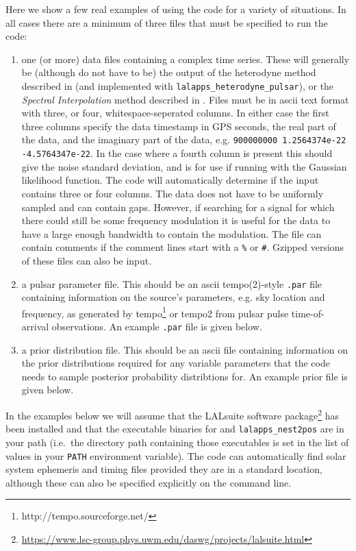 Here we show a few real examples of using the code for a variety of situations. In all cases there are a minimum of
three files that must be specified to run the code:
\begin{enumerate}
 \item one (or more) data files containing a complex time series. These will generally be (although do not have to be) the output
 of the heterodyne method described in \citep{2005PhRvD..72j2002D} (and implemented with {\tt lalapps\_heterodyne\_pulsar}), or
 the {\it Spectral Interpolation} method described in \citep{2017CQGra..34a5010D}. Files must be in ascii text format with three, or
 four, whitespace-seperated columns. In either case the first three columns
 specify the data timestamp in GPS seconds, the real part of the data, and the imaginary part of the data, e.g.
 \verb|900000000 1.2564374e-22 -4.5764347e-22|. In the case where a fourth column is present this should give the noise standard
 deviation, and is for use if running with the Gaussian likelihood function. The code will automatically determine if the input
 contains three or four columns. The data does not have to be uniformly sampled and can 
contain gaps. However,
 if searching for a signal for which there could still be some frequency modulation it is useful for the data to have a large
 enough bandwidth to contain the modulation.
 The file can contain comments if the comment lines start with
 a \verb|%| or \verb|#|. Gzipped versions of these files can also be input.
 \item a pulsar parameter file. This should be an ascii {\sc tempo(2)}-style \verb|.par| file containing information on the
 source's parameters, e.g. sky location and frequency, as generated by {\sc tempo}\footnote{http://tempo.sourceforge.net/} or
 {\sc tempo2} \citep{2006MNRAS.369..655H}  from pulsar pulse time-of-arrival observations. An example \verb|.par| file is given below.
 \item a prior distribution file. This should be an ascii file containing information on the prior distributions
 required for any variable parameters that the code needs to sample posterior probability distribtions for. An example
 prior file is given below.
\end{enumerate}

In the examples below we will assume that the LALsuite software package\footnote{\url{https://www.lsc-group.phys.uwm.edu/daswg/projects/lalsuite.html}} has
been installed and that the executable binaries for \lppen and {\tt lalapps\_nest2pos} are in your path (i.e.\ the directory path containing those
executables is set in the list of values in your {\tt PATH} environment variable). The code can automatically find solar system ephemeris and timing
files provided they are in a standard location, although these can also be specified explicitly on the command line.

